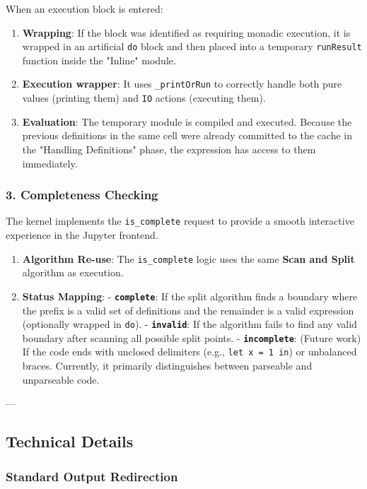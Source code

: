 When an execution block is entered:
\begin{enumerate}
\item \textbf{Wrapping}: If the block was identified as requiring monadic execution, it is wrapped in an artificial \texttt{do} block and then placed into a temporary \texttt{runResult} function inside the "Inline" module.
\item \textbf{Execution wrapper}: It uses \texttt{\_printOrRun} to correctly handle both pure values (printing them) and \texttt{IO} actions (executing them).
\item \textbf{Evaluation}: The temporary module is compiled and executed. Because the previous definitions in the same cell were already committed to the cache in the "Handling Definitions" phase, the expression has access to them immediately.
\end{enumerate}


\subsubsection{3. Completeness Checking}


The kernel implements the \texttt{is\_complete} request to provide a smooth interactive experience in the Jupyter frontend.
\begin{enumerate}
\item \textbf{Algorithm Re-use}: The \texttt{is\_complete} logic uses the same \textbf{Scan and Split} algorithm as execution.
\item \textbf{Status Mapping}:
    - \textbf{\texttt{complete}}: If the split algorithm finds a boundary where the prefix is a valid set of definitions and the remainder is a valid expression (optionally wrapped in \texttt{do}).    - \textbf{\texttt{invalid}}: If the algorithm fails to find any valid boundary after scanning all possible split points.    - \textbf{\texttt{incomplete}}: (Future work) If the code ends with unclosed delimiters (e.g., \texttt{let x = 1 in}) or unbalanced braces. Currently, it primarily distinguishes between parseable and unparseable code.\end{enumerate}


---
\subsection{Technical Details}


\subsubsection{Standard Output Redirection}


